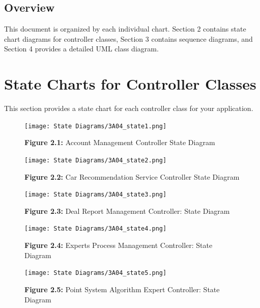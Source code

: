 \documentclass[]{article}
\begin{document}
\subsection{Overview}
\label{sub:overview}
This document is organized by each individual chart. Section 2 contains state chart diagrams for controller classes, Section 3 contains sequence diagrams, and Section 4 provides a detailed UML class diagram. \newpage


\section{State Charts for Controller Classes}
\label{sec:state_charts_for_controller_classes}
This section provides a state chart for each controller class for your application.


\begin{figure}[H]
  \centering
  \texttt{[image: State Diagrams/3A04\_state1.png]}
  
  \textbf{Figure 2.1:} Account Management Controller State Diagram\label{Fig:2.1}
\end{figure}

\begin{figure}[H]
  \centering
  \texttt{[image: State Diagrams/3A04\_state2.png]}
  
  \textbf{Figure 2.2:} Car Recommendation Service Controller State Diagram\label{Fig:2.2}
\end{figure}

\begin{figure}[H]
  \centering
  \texttt{[image: State Diagrams/3A04\_state3.png]}
  
  \textbf{Figure 2.3:} Deal Report Management Controller: State Diagram\label{Fig:2.3}
\end{figure}

\begin{figure}[H]
  \centering
  \texttt{[image: State Diagrams/3A04\_state4.png]}
  
  \textbf{Figure 2.4:} Experts Process Management Controller: State Diagram\label{Fig:2.4}
\end{figure}

\begin{figure}[H]
  \centering
  \texttt{[image: State Diagrams/3A04\_state5.png]}
  
  \textbf{Figure 2.5:} Point System Algorithm Expert Controller: State Diagram\label{Fig:2.5}
\end{figure}
\end{document}
